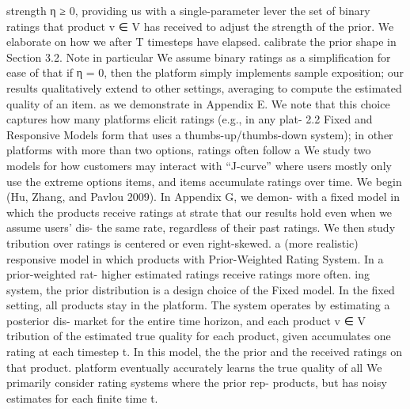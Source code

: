 \documentclass[10pt]{article}
\begin{document}
\begin{ReviewVerbatim}
                                                                                strength η ≥ 0, providing us with a single-parameter lever
the set of binary ratings that product v ∈ V has received
                                                                                to adjust the strength of the prior. We elaborate on how we
after T timesteps have elapsed.
                                                                                calibrate the prior shape in Section 3.2. Note in particular
   We assume binary ratings as a simplification for ease of
                                                                                that if η = 0, then the platform simply implements sample
exposition; our results qualitatively extend to other settings,
                                                                                averaging to compute the estimated quality of an item.
as we demonstrate in Appendix E. We note that this choice
captures how many platforms elicit ratings (e.g., in any plat-                  2.2   Fixed and Responsive Models
form that uses a thumbs-up/thumbs-down system); in other
platforms with more than two options, ratings often follow a                    We study two models for how customers may interact with
“J-curve” where users mostly only use the extreme options                       items, and items accumulate ratings over time. We begin
(Hu, Zhang, and Pavlou 2009). In Appendix G, we demon-                          with a fixed model in which the products receive ratings at
strate that our results hold even when we assume users’ dis-                    the same rate, regardless of their past ratings. We then study
tribution over ratings is centered or even right-skewed.                        a (more realistic) responsive model in which products with
   Prior-Weighted Rating System. In a prior-weighted rat-                       higher estimated ratings receive ratings more often.
ing system, the prior distribution is a design choice of the                       Fixed model. In the fixed setting, all products stay in the
platform. The system operates by estimating a posterior dis-                    market for the entire time horizon, and each product v ∈ V
tribution of the estimated true quality for each product, given                 accumulates one rating at each timestep t. In this model, the
the prior and the received ratings on that product.                             platform eventually accurately learns the true quality of all
   We primarily consider rating systems where the prior rep-                    products, but has noisy estimates for each finite time t.

\end{ReviewVerbatim}
\end{document}
